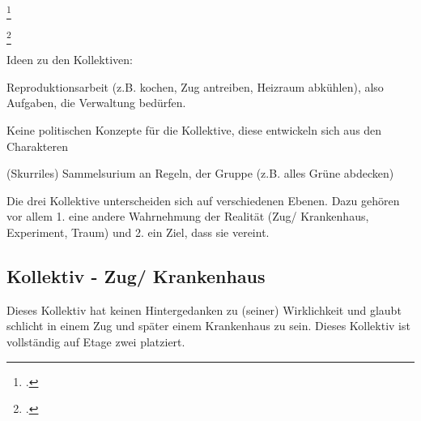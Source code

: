 \documentclass[12pt, a4paper, openany]{report}
\let\tempone\itemize
\let\temptwo\enditemize
\renewenvironment{itemize}{\tempone\addtolength{\itemsep}{-0.5\baselineskip}}{\temptwo}
\begin{document}
\begin{itemize}
    \item[]  \\
    \item[] \footcite[][§ 147, S. 162]{hegel_grundlinien_2017} \\
    \item[] \footcite[][§151, S. 166]{hegel_grundlinien_2017}
\end{itemize}

Ideen zu den Kollektiven:
\begin{itemize}
\item Reproduktionsarbeit (z.B. kochen, Zug antreiben, Heizraum abkühlen), also Aufgaben, die Verwaltung bedürfen.
\item Keine politischen Konzepte für die Kollektive, diese entwickeln sich aus den Charakteren 
\item (Skurriles) Sammelsurium an Regeln, der Gruppe (z.B. alles Grüne abdecken)
\end{itemize}

Die drei Kollektive unterscheiden sich auf verschiedenen Ebenen. 
Dazu gehören vor allem 1. eine andere Wahrnehmung der Realität (Zug/ Krankenhaus, Experiment, Traum) und 2. ein Ziel, dass sie vereint.

\subsection{Kollektiv - Zug/ Krankenhaus}
Dieses Kollektiv hat keinen Hintergedanken zu (seiner) Wirklichkeit und glaubt schlicht in einem Zug und später einem Krankenhaus zu sein. 
Dieses Kollektiv ist vollständig auf Etage zwei platziert. 
\end{document}
